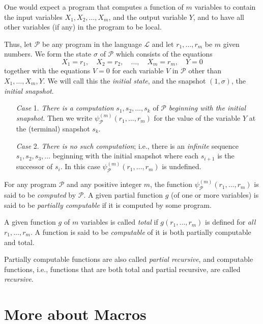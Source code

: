 \documentclass[a4paper,10pt,twoside]{book}
\begin{document}
One would expect a program that computes a function of $m$ variables to contain the input variables $X_1,X_2,\ldots,X_m$, and the output variable $Y$, and to have all other variables (if any) in the program to be local.

Thus, let $\mathscr{P}$ be any program in the language $\mathscr{L}$ and let $r_1,\ldots,r_m$ be $m$ given numbers. We form the state $\sigma$ of $\mathscr{P}$ which consists of the equations $$X_1=r_1,\quad X_2=r_2,\quad \ldots,\quad X_m=r_m,\quad Y=0$$ together with the equations $V=0$ for each variable $V$ in $\mathscr{P}$ other than $X_1,\ldots,X_m,Y$. We will call this the \textit{initial state}, and the snapshot $(1,\sigma)$, the \textit{initial snapshot}.

\begin{itemize}
    \item[\textit{Case} 1.] \textit{There is a computation} $s_1,s_2,\ldots,s_k$ of $\mathscr{P}$ \textit{beginning with the initial snapshot}. Then we write $\psi_{\mathscr{P}}^{(m)}(r_1,\ldots,r_m)$ for the value of the variable $Y$ at the (terminal) snapshot $s_k$.
    \item[\textit{Case} 2.] \textit{There is no such computation}; i.e., there is an \textit{infinite} sequence $s_1,s_2,s_3,\ldots$ beginning with the initial snapshot where each $s_{i+1}$ is the successor of $s_i$. In this case $\psi_{\mathscr{P}}^{(m)}(r_1,\ldots,r_m)$ is undefined.
\end{itemize}

For any program $\mathscr{P}$ and any positive integer $m$, the function $\psi_{\mathscr{P}}^{(m)}(r_1,\ldots,r_m)$ is said to be \textit{computed} by $\mathscr{P}$. A given partial function $g$ (of one or more variables) is said to be \textit{partially computable} if it is computed by some program.

A given function $g$ of $m$ variables is called \textit{total} if $g(r_1,\ldots,r_m)$ is defined for \textit{all} $r_1,\ldots,r_m$. A function is said to be \textit{computable} of it is both partially computable and total.

Partially computable functions are also called \textit{partial recursive}, and computable functions, i.e., functions that are both total and partial recursive, are called \textit{recursive}.

\section{More about Macros}
\end{document}
